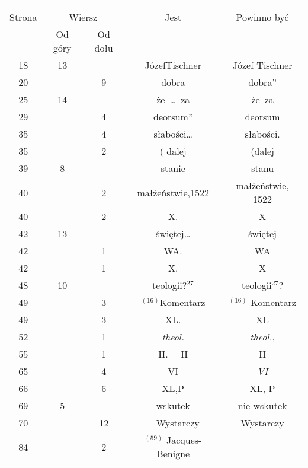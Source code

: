 \documentclass[a4paper,11pt]{article}
\begin{document}
\vspace{\spaceFour}





\newpage



\begin{center}

  \begin{tabular}{|c|c|c|c|c|}
    \hline
    & \multicolumn{2}{c|}{} & & \\
    Strona & \multicolumn{2}{c|}{Wiersz} & Jest
                              & Powinno być \\ \cline{2-3}
    & Od góry & Od dołu & & \\
    \hline
    18  & 13 & & JózefTischner & Józef Tischner \\
    20  & &  9 & dobra & dobra” \\
        25  & 14 & & że~\ldots~za & że~za \\
    29  & &  4 & deorsum” & deorsum \\
    35  & &  4 & słabości\ldots & słabości. \\
    35  & &  2 & ( dalej & (dalej \\
    39  &  8 & & stanie & stanu \\
    40  & &  2 & małżeństwie,1522 & małżeństwie, 1522 \\
    40  & &  2 & X. & X \\
    42  & 13 & & świętej\ldots & świętej \\
    42  & &  1 & WA. & WA \\
    42  & &  1 & X. & X \\
    48  & 10 & & teologii?$^{ 27 }$ & teologii$^{ 27 }$? \\
    49  & &  3 & $^{ ( 16 ) }$Komentarz & $^{ ( 16 ) }$ Komentarz \\
    49  & &  3 & XL. & XL \\
    52  & &  1 & \textit{theol.} & \textit{theol.}, \\
    55  & &  1 & II. --~II & II \\
    65  & &  4 & VI & \textit{VI} \\
    66  & &  6 & XL,P & XL, P \\
    69  &  5 & & wskutek & nie wskutek \\
    70  & & 12 & --~Wystarczy & Wystarczy \\
    84  & &  2 & $^{ ( 59 ) }$\hspace{0.3em} Jacques-Benigne

\end{tabular}
\end{center}
\end{document}
